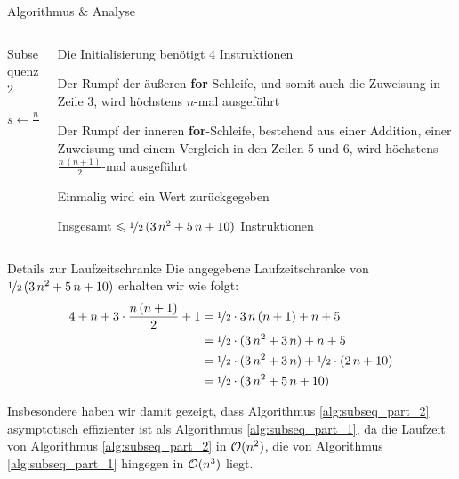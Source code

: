 \begin{frame}{Algorithmus \& Analyse}
\begin{columns}[T,onlytextwidth]
\begin{column}{0.43\textwidth}
\vspace{-5pt}
\begin{algorithm}[H]
	\caption{Subsequenz 2}
	\label{alg:subseq_part_2}
	\DontPrintSemicolon
	$s \gets \frac{n \, (n+1)}{4}$\;
    \Return{\False}
\end{algorithm}
\end{column}
\begin{column}{0.51\textwidth}
    Die Initialisierung ben\"otigt 4 Instruktionen
    
    \medskip
    
    Der Rumpf der \"au{\ss}eren \textbf{for}-Schleife, und somit auch die Zuweisung in Zeile 3, wird h\"ochstens $n$-mal ausgef\"uhrt
    
    \medskip
    
    Der Rumpf der inneren \textbf{for}-Schleife, bestehend aus einer Addition, einer Zuweisung und einem Vergleich in den Zeilen 5 und 6, wird h\"ochstens $\frac{n \, (n+1)}{2}$-mal ausgef\"uhrt
    
    \medskip
    
    Einmalig wird ein Wert zur\"uckgegeben
    
    \medskip
    
    Insgesamt $\leq \nicefrac{1}{2} \, (3 \, n^2 + 5 \, n + 10)$ Instruktionen
\end{column}
\end{columns}
\end{frame}

\begin{frame}{Details zur Laufzeitschranke}
    Die angegebene Laufzeitschranke von $\nicefrac{1}{2} \, (3 \, n^2 + 5 \, n + 10)$ erhalten wir wie folgt:
    \begin{align*}
        4 + n + 3 \cdot \frac{n \, (n+1)}{2} + 1 &= \nicefrac{1}{2} \cdot 3 \, n \, (n+1) + n + 5 \\
        &= \nicefrac{1}{2} \cdot (3 \, n^2 + 3\, n) + n + 5 \\
        &= \nicefrac{1}{2} \cdot (3 \, n^2 + 3\, n) + \nicefrac{1}{2} \cdot (2 \, n + 10) \\
        &= \nicefrac{1}{2} \cdot (3 \, n^2 + 5\, n + 10)
    \end{align*}

    \begin{remark}
    Insbesondere haben wir damit gezeigt, dass Algorithmus \ref{alg:subseq_part_2} \alert{asymptotisch effizienter} ist als Algorithmus \ref{alg:subseq_part_1}, da die Laufzeit von Algorithmus \ref{alg:subseq_part_2} in $\bigO(n^2)$, die von Algorithmus \ref{alg:subseq_part_1} hingegen in $\bigO(n^3)$ liegt.
    \end{remark}
\end{frame}
